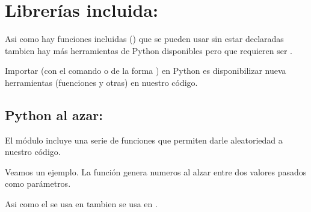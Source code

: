 \documentclass[a4paper,12pt,spanish]{sphinxmanual}
\begin{document}
\sphinxstepscope


\chapter{Librerías incluida: }
\label{\detokenize{random:librerias-incluida-random}}\label{\detokenize{random::doc}}
\sphinxAtStartPar
Asi como hay funciones incluidas () que se pueden usar sin
estar declaradas tambien hay más herramientas de Python disponibles pero
que requieren ser .

\sphinxAtStartPar
Importar (con el comando  o de la forma )
en Python es disponibilizar nueva herramientas (fuenciones y otras) en
nuestro código.


\section{Python al azar: }
\label{\detokenize{random:python-al-azar-random}}
\sphinxAtStartPar
El módulo  incluye una serie de funciones que permiten
darle aleatoriedad a nuestro código.

\sphinxAtStartPar
Veamos un ejemplo. La función  genera numeros al alzar
entre dos valores pasados como parámetros.

\begin{sphinxVerbatim}[commandchars=\\\{\}]
   

   

 
   
\end{sphinxVerbatim}

\sphinxAtStartPar
Asi como el  se usa en  tambien se usa
en .
\end{document}
